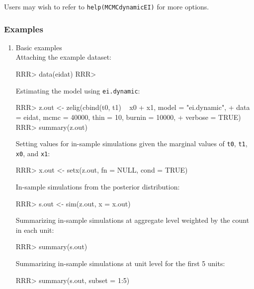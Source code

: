 \noindent Users may wish to refer to \texttt{help(MCMCdynamicEI)} for more options.



\subsubsection{Examples}

\begin{enumerate}
 \item Basic examples \\
 Attaching the example dataset:
\begin{Schunk}
\begin{Sinput}
RRR>  data(eidat)
RRR> 
\end{Sinput}
\end{Schunk}
Estimating the model using \texttt{ei.dynamic}:
\begin{Schunk}
\begin{Sinput}
RRR>  z.out <- zelig(cbind(t0, t1) ~ x0 + x1, model = "ei.dynamic", 
+                  data = eidat,  mcmc = 40000, thin = 10, burnin = 10000, 
+                  verbose = TRUE)
RRR>  summary(z.out)
\end{Sinput}
\end{Schunk}
Setting values for in-sample simulations given the marginal values 
of {\tt t0}, {\tt t1}, {\tt x0}, and {\tt x1}:
\begin{Schunk}
\begin{Sinput}
RRR>  x.out <- setx(z.out, fn = NULL, cond = TRUE)
\end{Sinput}
\end{Schunk}
In-sample simulations from the posterior distribution:
\begin{Schunk}
\begin{Sinput}
RRR> s.out <- sim(z.out, x = x.out)
\end{Sinput}
\end{Schunk}
Summarizing in-sample simulations at aggregate level 
weighted by the count in each unit:
\begin{Schunk}
\begin{Sinput}
RRR>  summary(s.out)
\end{Sinput}
\end{Schunk}
Summarizing in-sample simulations at unit level for the first 5 units:
\begin{Schunk}
\begin{Sinput}
RRR>  summary(s.out, subset = 1:5)
\end{Sinput}
\end{Schunk}
\end{enumerate}
\clearpage
